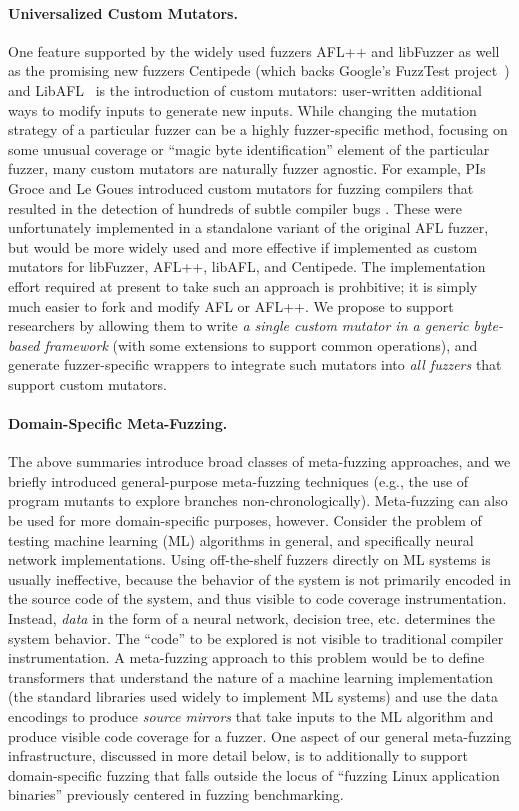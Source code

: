 \paragraph{Universalized Custom Mutators.}  One feature supported by
the widely used fuzzers AFL++ and libFuzzer as well as the promising
new fuzzers Centipede (which backs Google's FuzzTest
project~\cite{fuzztest}) and LibAFL~\cite{libafl} is the introduction of custom mutators:  user-written 
additional ways to modify inputs to generate new inputs.  While changing the 
mutation strategy of a particular fuzzer can be a highly fuzzer-specific 
method, focusing on some unusual coverage or ``magic byte identification'' 
element of the particular fuzzer, many custom mutators are naturally fuzzer 
agnostic.  For example, PIs Groce and Le Goues introduced custom mutators for 
fuzzing compilers that resulted in the detection of hundreds of subtle compiler 
bugs \cite{cc2022}. These were unfortunately implemented in a standalone variant of the 
original AFL fuzzer, but would be more widely used and more effective if 
implemented as custom mutators for libFuzzer, AFL++, libAFL, and
Centipede.  The implementation effort required at present to take such
an approach is prohbitive; it is simply much easier to fork and modify
AFL or AFL++.  We propose to support 
researchers by allowing them to write \emph{a single custom mutator 
in a generic byte-based framework} (with some extensions to support
common operations), and generate fuzzer-specific wrappers to integrate such 
mutators into \emph{all fuzzers} that support custom mutators.

\paragraph{Domain-Specific Meta-Fuzzing.} The above summaries introduce 
broad classes of meta-fuzzing approaches, and we briefly introduced  
general-purpose meta-fuzzing techniques (e.g., the use of program mutants to 
explore branches non-chronologically).  Meta-fuzzing can also be used for more 
domain-specific purposes, however.  Consider the problem of testing machine 
learning (ML) algorithms in general, and specifically neural network 
implementations.  Using off-the-shelf fuzzers directly on ML systems is usually 
ineffective, because the behavior of the system is not primarily encoded in the 
source code of the system, and thus visible to code coverage instrumentation.  
Instead, \emph{data} in the form of a neural network, decision tree, etc. 
determines the system behavior.  The ``code'' to be explored is not visible to 
traditional compiler instrumentation.  A meta-fuzzing approach to this problem 
would be to define transformers that understand the nature of a machine 
learning implementation (the standard libraries used widely to implement ML 
systems) and use the data encodings to produce \emph{source mirrors} that take 
inputs to the ML algorithm and produce visible code coverage for a fuzzer.  One 
aspect of our general meta-fuzzing infrastructure, discussed in more detail 
below, is to additionally to support domain-specific fuzzing that falls outside 
the locus of ``fuzzing Linux application binaries'' previously centered in 
fuzzing benchmarking.


